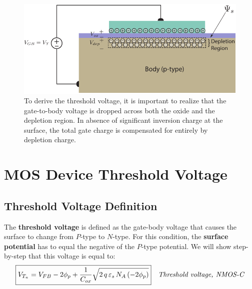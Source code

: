 \newpage
\begin{figure}[t]
\centering
\includegraphics[width=.95\columnwidth]{mos_cap_threshold}
\caption{To derive the threshold voltage, it is important to realize that the gate-to-body voltage is dropped across both the oxide and the depletion region.  In absence of significant inversion charge at the surface, the total gate charge is compensated for entirely by depletion charge.}
\label{fig:mos_vt_derive}
\end{figure} 
\section{MOS Device Threshold Voltage}
\subsection{Threshold Voltage Definition}
The \textbf{threshold voltage} is defined as the gate-body voltage that causes the surface to change from $P$-type to $N$-type.  For this condition, the \textbf{surface potential} has to equal the negative of the $P$-type potential.  We will show step-by-step that this voltage is equal to:
    \begin{align}
        \Aboxed{ V_{T_n} &= V_{FB} - 2\phi_p + \frac{1}{C_{ox}} \sqrt{2\,q\,\varepsilon _s\,N_A\,(-2\phi_p)} } &\textit{Threshold voltage, NMOS-C}
    \end{align}
